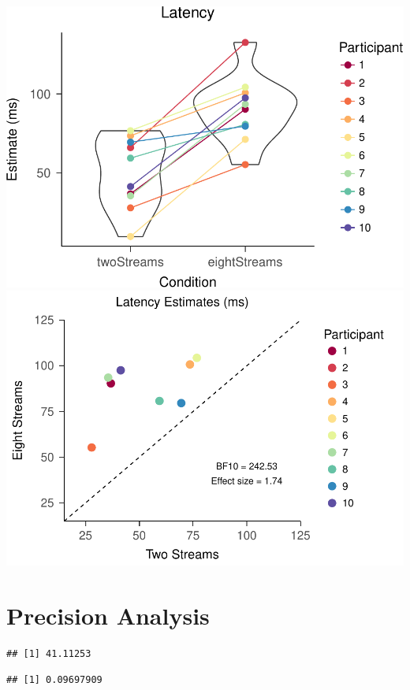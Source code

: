 \documentclass[,man]{apa6}
\begin{document}
\includegraphics{nStreams_Bayesian_files/figure-latex/unnamed-chunk-3-1.pdf}
\includegraphics{nStreams_Bayesian_files/figure-latex/unnamed-chunk-3-2.pdf}

\section{Precision Analysis}\label{precision-analysis}

\begin{verbatim}
## [1] 41.11253
\end{verbatim}

\begin{verbatim}
## [1] 0.09697909
\end{verbatim}
\end{document}
